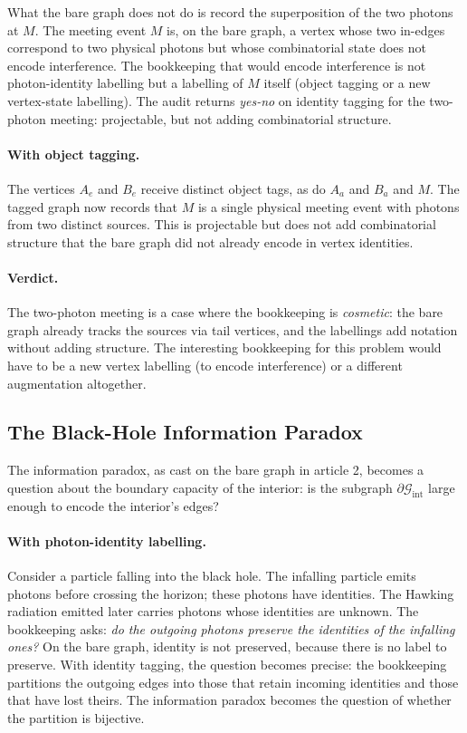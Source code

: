 \documentclass[11pt]{article}
\begin{document}
What the bare graph does not do is record the superposition of the two photons at $M$. The meeting event $M$ is, on the bare graph, a vertex whose two in-edges correspond to two physical photons but whose combinatorial state does not encode interference. The bookkeeping that would encode interference is not photon-identity labelling but a labelling of $M$ itself (object tagging or a new vertex-state labelling). The audit returns \emph{yes-no} on identity tagging for the two-photon meeting: projectable, but not adding combinatorial structure.

\paragraph{With object tagging.} The vertices $A_e$ and $B_e$ receive distinct object tags, as do $A_a$ and $B_a$ and $M$. The tagged graph now records that $M$ is a single physical meeting event with photons from two distinct sources. This is projectable but does not add combinatorial structure that the bare graph did not already encode in vertex identities.

\paragraph{Verdict.} The two-photon meeting is a case where the bookkeeping is \emph{cosmetic}: the bare graph already tracks the sources via tail vertices, and the labellings add notation without adding structure. The interesting bookkeeping for this problem would have to be a new vertex labelling (to encode interference) or a different augmentation altogether.

\subsection{The Black-Hole Information Paradox}

The information paradox, as cast on the bare graph in article 2, becomes a question about the boundary capacity of the interior: is the subgraph $\partial \mathcal{G}_{\mathrm{int}}$ large enough to encode the interior's edges?

\paragraph{With photon-identity labelling.} Consider a particle falling into the black hole. The infalling particle emits photons before crossing the horizon; these photons have identities. The Hawking radiation emitted later carries photons whose identities are unknown. The bookkeeping asks: \emph{do the outgoing photons preserve the identities of the infalling ones?} On the bare graph, identity is not preserved, because there is no label to preserve. With identity tagging, the question becomes precise: the bookkeeping partitions the outgoing edges into those that retain incoming identities and those that have lost theirs. The information paradox becomes the question of whether the partition is bijective.
\end{document}
